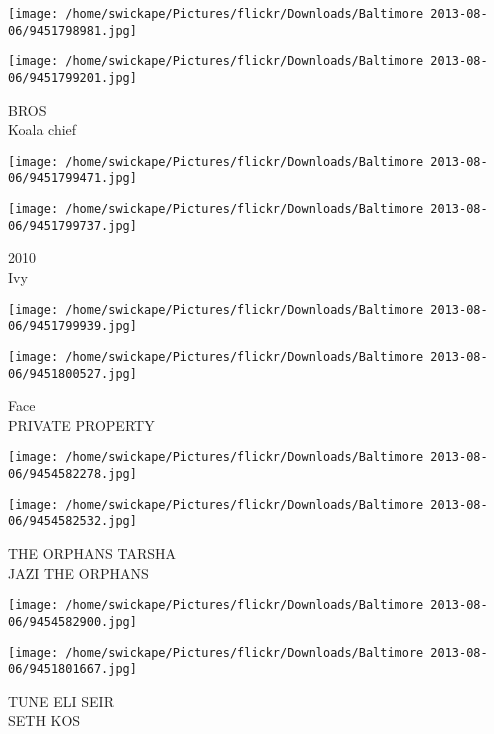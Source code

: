 \documentclass[10pt,letterpaper]{article}
\begin{document}
\texttt{[image: /home/swickape/Pictures/flickr/Downloads/Baltimore 2013-08-06/9451798981.jpg]}

\vspace{0.25in}
\texttt{[image: /home/swickape/Pictures/flickr/Downloads/Baltimore 2013-08-06/9451799201.jpg]}

BROS\\
Koala chief\\
\pagebreak

\texttt{[image: /home/swickape/Pictures/flickr/Downloads/Baltimore 2013-08-06/9451799471.jpg]}

\vspace{0.25in}
\texttt{[image: /home/swickape/Pictures/flickr/Downloads/Baltimore 2013-08-06/9451799737.jpg]}

2010\\
Ivy\\
\pagebreak

\texttt{[image: /home/swickape/Pictures/flickr/Downloads/Baltimore 2013-08-06/9451799939.jpg]}

\vspace{0.25in}
\texttt{[image: /home/swickape/Pictures/flickr/Downloads/Baltimore 2013-08-06/9451800527.jpg]}

Face\\
PRIVATE PROPERTY\\
\pagebreak

\texttt{[image: /home/swickape/Pictures/flickr/Downloads/Baltimore 2013-08-06/9454582278.jpg]}

\vspace{0.25in}
\texttt{[image: /home/swickape/Pictures/flickr/Downloads/Baltimore 2013-08-06/9454582532.jpg]}

THE ORPHANS TARSHA\\
JAZI THE ORPHANS\\
\pagebreak

\texttt{[image: /home/swickape/Pictures/flickr/Downloads/Baltimore 2013-08-06/9454582900.jpg]}

\vspace{0.25in}
\texttt{[image: /home/swickape/Pictures/flickr/Downloads/Baltimore 2013-08-06/9451801667.jpg]}

TUNE ELI SEIR\\
SETH KOS\\
\pagebreak
\end{document}
